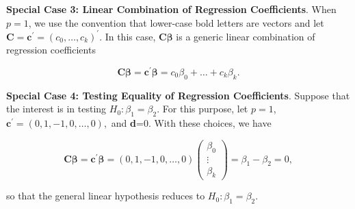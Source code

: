 \textbf{Special Case 3: Linear Combination of Regression
Coefficients}. When $p=1$, we use the convention that lower-case
bold letters are vectors and let $\mathbf{C = c^{\prime}}=
\left(c_0, \ldots, c_k \right)^{\prime}$. In this case, $\mathbf{C}
\boldsymbol \beta$ is a generic linear combination of regression
coefficients

\begin{equation*}
\mathbf{C} \boldsymbol \beta =\mathbf{c}^{\prime} \boldsymbol \beta
= c_0 \beta_0 + \ldots + c_k \beta_k.
\end{equation*}

\bigskip

\textbf{Special Case 4: Testing Equality of Regression
Coefficients}. Suppose that the interest is in testing $H_0: \beta_1
= \beta_2.$ For this purpose, let $p=1$, $\mathbf{c}^{\prime}=
\left(0,1, -1, 0, \ldots, 0\right),$ and \textbf{d}=0. With these
choices, we have

\begin{equation*}
\mathbf{C \boldsymbol \beta = c^{\prime} \boldsymbol \beta}=
\left(0,1, -1, 0, \ldots, 0\right) \left(
\begin{array}{c}
\beta_0 \\
\vdots  \\
\beta_k
\end{array}
\right) =\beta_1 - \beta_2 = 0,
\end{equation*}

\noindent so that the general linear hypothesis reduces to $H_0:
\beta_1 = \beta_2.$


